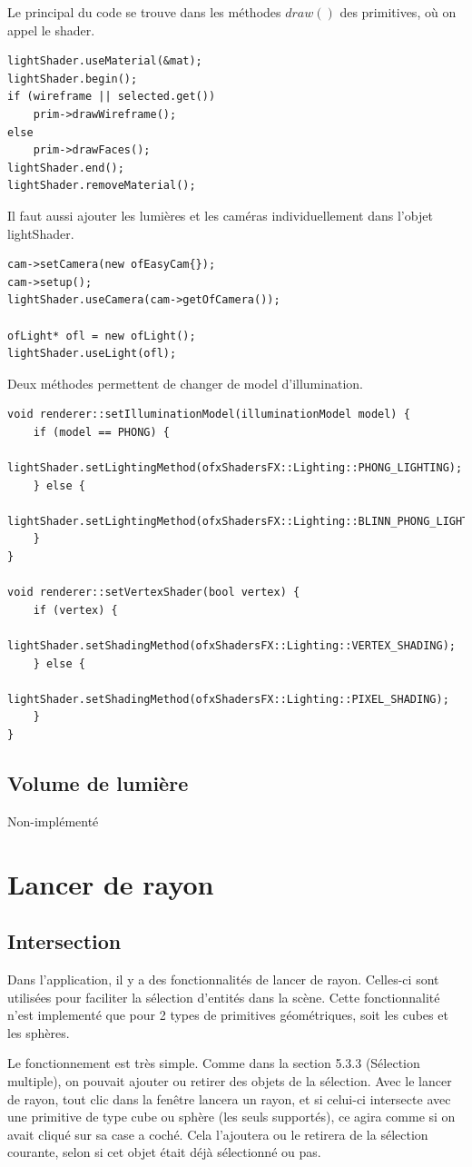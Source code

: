 Le principal du code se trouve dans les méthodes $draw()$ des primitives, où on appel le shader.
\begin{lstlisting}
lightShader.useMaterial(&mat);
lightShader.begin();
if (wireframe || selected.get())
	prim->drawWireframe();
else
	prim->drawFaces();
lightShader.end();
lightShader.removeMaterial();
\end{lstlisting}
Il faut aussi ajouter les lumières et les caméras individuellement dans l'objet lightShader.
\begin{lstlisting}
cam->setCamera(new ofEasyCam{});
cam->setup();
lightShader.useCamera(cam->getOfCamera());

ofLight* ofl = new ofLight();
lightShader.useLight(ofl);
\end{lstlisting}
Deux méthodes permettent de changer de model d'illumination.
\begin{lstlisting}
void renderer::setIlluminationModel(illuminationModel model) {
	if (model == PHONG) {
		lightShader.setLightingMethod(ofxShadersFX::Lighting::PHONG_LIGHTING);
	} else {
		lightShader.setLightingMethod(ofxShadersFX::Lighting::BLINN_PHONG_LIGHTING);
	}
}

void renderer::setVertexShader(bool vertex) {
	if (vertex) {
		lightShader.setShadingMethod(ofxShadersFX::Lighting::VERTEX_SHADING);
	} else {
		lightShader.setShadingMethod(ofxShadersFX::Lighting::PIXEL_SHADING);
	}
}
\end{lstlisting}

\subsection{Volume de lumière}
Non-implémenté


\pagebreak
\section{Lancer de rayon}
\subsection{Intersection}
Dans l'application, il y a des fonctionnalités de lancer de rayon. Celles-ci sont utilisées pour faciliter la sélection d'entités dans la scène. Cette fonctionnalité n'est implementé que pour 2 types de primitives géométriques, soit les cubes et les sphères.

Le fonctionnement est très simple. Comme dans la section 5.3.3 (Sélection multiple), on pouvait ajouter ou retirer des objets de la sélection. Avec le lancer de rayon, tout clic dans la fenêtre lancera un rayon, et si celui-ci intersecte avec une primitive de type cube ou sphère (les seuls supportés), ce agira comme si on avait cliqué sur sa case a coché. Cela l'ajoutera ou le retirera de la sélection courante, selon si cet objet était déjà sélectionné ou pas.

